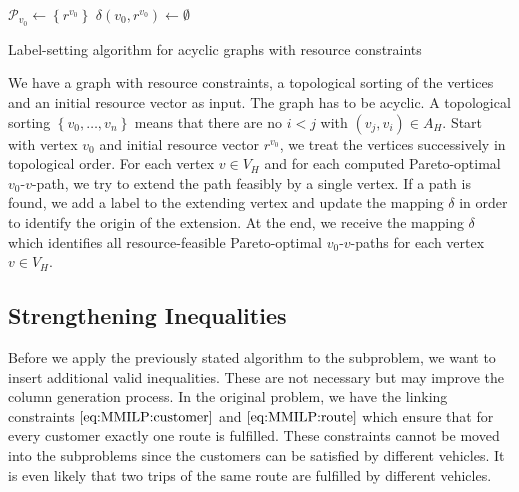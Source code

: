 \begin{algorithm}[hbt]
	\SetAlgoLined
	$\mathcal{P}_{v_0}\gets\left\{r^{v_0}\right\}$ \;
	$\delta\left(v_0,r^{v_0}\right)\gets\emptyset$ \;
	\Return{$\delta$}
	\caption{Label-setting algorithm for acyclic graphs with resource constraints} \label{alg:label_setting}
\end{algorithm}

We have a graph with resource constraints, a topological sorting of the vertices and an initial resource vector as input. The graph has to be acyclic. A topological sorting ${\left\{v_0,\dots,v_n\right\}}$ means that there are no $i<j$ with ${\left(v_j,v_i\right)\in A_H}$. Start with vertex $v_0$ and initial resource vector $r^{v_0}$, we treat the vertices successively in topological order. For each vertex $v\in V_H$ and for each computed Pareto-optimal $v_0$-$v$-path, we try to extend the path feasibly by a single vertex. If a path is found, we add a label to the extending vertex and update the mapping $\delta$ in order to identify the origin of the extension. At the end, we receive the mapping $\delta$ which identifies all resource-feasible Pareto-optimal $v_0$-$v$-paths for each vertex $v\in V_H$.


\subsection{Strengthening Inequalities}

Before we apply the previously stated algorithm to the subproblem, we want to insert additional valid inequalities. These are not necessary but may improve the column generation process. In the original problem, we have the linking constraints $\eqref{eq:MMILP:customer}$ and $\eqref{eq:MMILP:route}$ which ensure that for every customer exactly one route is fulfilled. These constraints cannot be moved into the subproblems since the customers can be satisfied by different vehicles. It is even likely that two trips of the same route are fulfilled by different vehicles.

